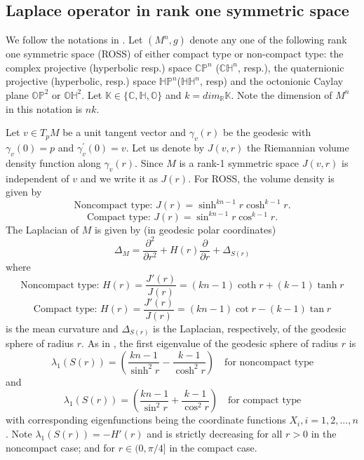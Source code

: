 \documentclass{amsart}
\numberwithin{equation}{section}
\theoremstyle{plain}
\theoremstyle{definition}
\theoremstyle{remark}
\def\RR {\mathbb{R}}
\def\KK {\mathbb{K}}
\def\CC {\mathbb{C}}
\def\HH {\mathbb{H}}
\def\OO {\mathbb{O}}
\def\PP {\mathbb{P}}
\begin{document}
\subsection{Laplace operator in  rank one symmetric space}
We follow the notations in \cite{aithal1996sharp}. Let $(M^n,g)$ denote any one of the following rank one symmetric space (ROSS) of either compact type or non-compact type: the complex projective (hyperbolic resp.) space $\CC\PP^n$ ($\CC\HH^n$, resp.), the quaternionic projective (hyperbolic, resp.) space $\HH\PP^n$($\HH\HH^n$, resp) and the octonionic Caylay plane $\OO\PP^2$ or $\OO\HH^2$. Let $\KK\in \{\CC,\HH,\OO\}$ and $k= dim_{\RR} \KK$. Note the dimension of $M^n$ in this notation is $nk$. 
\par Let $v \in T_p M$ be a unit tangent vector and $\gamma_v(r)$ be the geodesic with $\gamma_v(0)=p$ and $\gamma_v^{\prime}(0)=v$. Let us denote by $J(v, r)$ the Riemannian volume density function along $\gamma_v(r)$. Since $M$ is a rank-1 symmetric space $J(v, r)$ is independent of $v$ and we write it as $J(r)$. For ROSS, the volume density is given by \[\text{Noncompact type: }J(r)=\sinh ^{k n-1} r \cosh ^{k-1} r.\]\[\text{Compact type: }J(r)=\sin ^{k n-1} r \cos ^{k-1} r.\]
The Laplacian of $M$ is given by (in geodesic polar coordinates)
\[\Delta_M=\frac{\partial^2}{\partial r^2}+H(r) \frac{\partial}{\partial r}+\Delta_{S(r)}\]
where 
\begin{equation}
    \text{Noncompact type: } H(r)=\frac{J'(r)}{J(r)}=(k n-1) \operatorname{coth} r+(k-1) \tanh r
\end{equation}
\[\text{Compact type: } H(r)=\frac{J'(r)}{J(r)}=(k n-1) \operatorname{cot} r-(k-1) \tan r \] is the mean curvature and $\Delta_{S(r)}$ is the Laplacian, respectively, of the geodesic sphere of radius $r$. As in \cite{aithal1996sharp}, the first eigenvalue of the geodesic sphere of radius $r$ is 
\begin{equation}\label{Lambda1Sr}
    \lambda_1(S(r))=\left(\frac{k n-1}{\sinh ^2 r}-\frac{k-1}{\cosh ^2 r}\right)\quad \text{for noncompact type}
\end{equation}
and  \[\lambda_1(S(r))=\left(\frac{k n-1}{\sin ^2 r}+\frac{k-1}{\cos ^2 r}\right)\quad \text{for compact type}\] with corresponding eigenfunctions being the coordinate functions $X_i, i =1,2,...,n$. Note $\lambda_1(S(r))= -H'(r)$ and is strictly decreasing for all $r>0$ in the noncompact case; and for $r\in (0,\pi/4]$ in the compact case.
\end{document}
